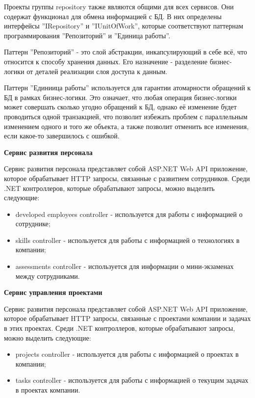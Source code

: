 Проекты группы repository также являются общими для всех сервисов. Они содержат функционал для обмена информацией с БД. В них определены интерфейсы ''IRepository'' и ''IUnitOfWork'', которые соответствуют паттернам программирования ''Репозиторий'' и ''Единица работы''.

Паттерн ''Репозиторий'' - это слой абстракции, инкапсулирующий в себе всё, что относится к способу хранения данных. Его назначение - разделение бизнес-логики от деталей реализации слоя доступа к данным.

Паттерн ''Единиица работы'' используется для гарантии атомарности обращений к БД в рамках бизнес-логики. Это означает, что любая операция бизнес-логики может совершать сколько угодно обращений к БД, однако её изменение будет проводиться одной транзакцией, что позволит избежать проблем с параллельным изменением одного и того же объекта, а также позволит отменить все изменения, если какое-то завершилось с ошибкой.

\bigskip
\textbf{Сервис развития персонала}

Сервис развития персонала представляет собой ASP.NET Web API приложение, которое обрабатывает HTTP запросы, связанные с развитием сотрудников. Среди .NET контроллеров, которые обрабатывают запросы, можно выделить следующие:

\begin{itemize}
    \item developed employees controller - используется для работы с информацией о сотруднике;
    \item skills controller - используется для работы с информацией о технологиях в компании;
    \item assessments controller - используется для информации о мини-экзаменах между сотрудниками.
\end{itemize}

\bigskip
\textbf{Сервис управления проектами}

Сервис развития персонала представляет собой ASP.NET Web API приложение, которое обрабатывает HTTP запросы, связанные с проектами компании и задачах в этих проектах. Среди .NET контроллеров, которые обрабатывают запросы, можно выделить следующие:

\begin{itemize}
    \item projects controller - используется для работы с информацией о проектах в компании;
    \item tasks controller - используется для работы с информацией о текущим задачах в проектах компании.
\end{itemize}

